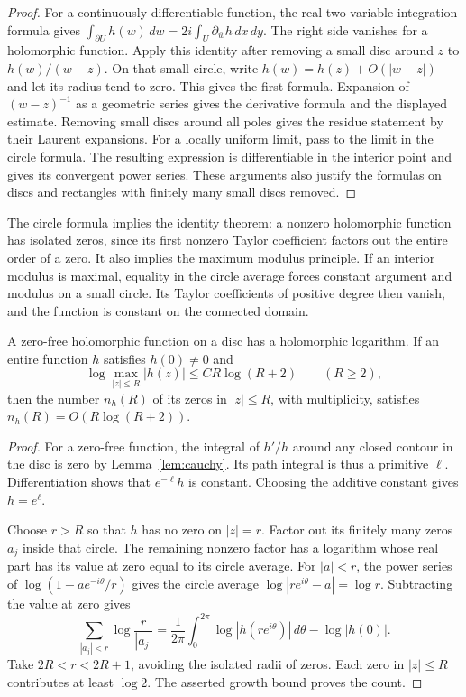\begin{proof}
For a continuously differentiable function, the real two-variable
integration formula gives
$\int_{\partial U}h(w)\,dw=2i\int_U\partial_{\bar w}h\,dx\,dy$.
The right side vanishes for a holomorphic function.
Apply this identity after removing a small disc around $z$ to
$h(w)/(w-z)$.  On that small circle, write
$h(w)=h(z)+O(|w-z|)$ and let its radius tend to zero.
This gives the first formula.
Expansion of $(w-z)^{-1}$ as a geometric series gives the derivative formula
and the displayed estimate.  Removing small discs around all poles gives
the residue statement by their Laurent expansions.
For a locally uniform limit, pass to the limit in the circle formula.
The resulting expression is differentiable in the interior point and gives
its convergent power series.  These arguments also justify the formulas
on discs and rectangles with finitely many small discs removed.
\end{proof}

The circle formula implies the identity theorem: a nonzero holomorphic
function has isolated zeros, since its first nonzero Taylor coefficient
factors out the entire order of a zero.  It also implies the maximum
modulus principle.  If an interior modulus is maximal, equality in the
circle average forces constant argument and modulus on a small circle.
Its Taylor coefficients of positive degree then vanish, and the function
is constant on the connected domain.

\begin{lemma}
\label{lem:jensen}
A zero-free holomorphic function on a disc has a holomorphic logarithm.
If an entire function $h$ satisfies $h(0)\ne0$ and
\[
 \log\max_{|z|\leq R}|h(z)|\leq C R\log(R+2)\qquad(R\geq2),
\]
then the number $n_h(R)$ of its zeros in $|z|\leq R$, with multiplicity,
satisfies $n_h(R)=O(R\log(R+2))$.
\end{lemma}

\begin{proof}
For a zero-free function, the integral of $h'/h$ around any closed contour
in the disc is zero by Lemma~\ref{lem:cauchy}.  Its path integral is thus a
primitive $\ell$.  Differentiation shows that $e^{-\ell}h$ is constant.
Choosing the additive constant gives $h=e^\ell$.

Choose $r>R$ so that $h$ has no zero on $|z|=r$.
Factor out its finitely many zeros $a_j$ inside that circle.
The remaining nonzero factor has a logarithm whose real part has its value
at zero equal to its circle average.
For $|a|<r$, the power series of $\log(1-ae^{-i\theta}/r)$ gives
the circle average $\log|re^{i\theta}-a|=\log r$.
Subtracting the value at zero gives
\[
 \sum_{|a_j|<r}\log\frac r{|a_j|}
 =\frac1{2\pi}\int_0^{2\pi}\log|h(re^{i\theta})|\,d\theta
       -\log|h(0)|.
\]
Take $2R<r<2R+1$, avoiding the isolated radii of zeros.
Each zero in $|z|\leq R$ contributes at least $\log2$.
The asserted growth bound proves the count.
\end{proof}

